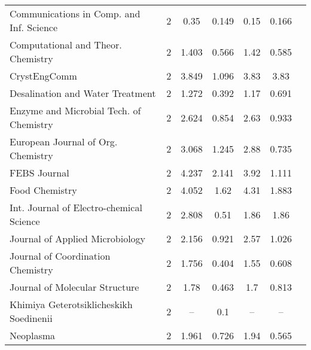 {{\begin{longtable}[c]{lcccccc}
 Communications in Comp. and Inf. Science                                           & 2      & 0.35    & 0.149 &  0.15      & 0.166                 \\
 Computational and Theor. Chemistry                                                 & 2      & 1.403   & 0.566 &  1.42      & 0.585                 \\
 CrystEngComm                                                                       & 2      & 3.849   & 1.096 &  3.83      & 3.83                  \\[1ex]
 Desalination and Water Treatment                                                   & 2      & 1.272   & 0.392 &  1.17      & 0.691                 \\
 Enzyme and Microbial Tech. of Chemistry                                            & 2      & 2.624   & 0.854 &  2.63      & 0.933                 \\
 European Journal of Org. Chemistry                                                 & 2      & 3.068   & 1.245 &  2.88      & 0.735                 \\
 FEBS Journal                                                                       & 2      & 4.237   & 2.141 &  3.92      & 1.111                 \\
 Food Chemistry                                                                     & 2      & 4.052   & 1.62  &  4.31      & 1.883                 \\[1ex]
 Int. Journal of Electro-chemical Science                                           & 2      & 2.808   & 0.51  &  1.86      & 1.86                  \\
 Journal of Applied Microbiology                                                    & 2      & 2.156   & 0.921 &  2.57      & 1.026                 \\
 Journal of Coordination Chemistry                                                  & 2      & 1.756   & 0.404 &  1.55      & 0.608                 \\
 Journal of Molecular Structure                                                     & 2      & 1.78    & 0.463 &  1.7       & 0.813                 \\[1ex]
 Khimiya Geterotsiklicheskikh Soedinenii                                            & 2      & --      & 0.1   &  --        & --                      \\
 Neoplasma                                                                          & 2      & 1.961   & 0.726 &  1.94      & 0.565                 \\

\end{longtable}}}

